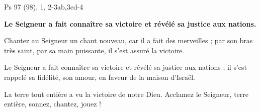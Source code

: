  Ps 97 (98), 1, 2-3ab,3cd-4

\textbf{
Le Seigneur a fait connaître sa victoire
et révélé sa justice aux nations.}

\smallskip

Chantez au Seigneur un chant nouveau,
car il a fait des merveilles ;
par son bras très saint, par sa main puissante,
il s’est assuré la victoire.

\smallskip

Le Seigneur a fait connaître sa victoire
et révélé sa justice aux nations ;
il s’est rappelé sa fidélité, son amour,
en faveur de la maison d’Israël.

\smallskip

La terre tout entière a vu
la victoire de notre Dieu.
Acclamez le Seigneur, terre entière,
sonnez, chantez, jouez !


